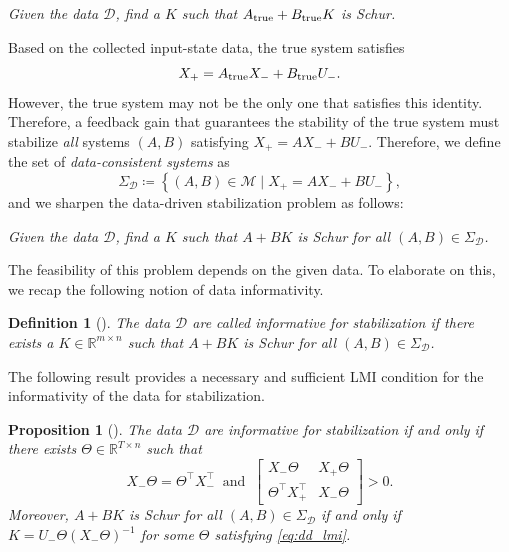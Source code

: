 \documentclass[9pt,shortpaper,twoside,web]{ieeecolor}
\newcommand{\set}[2]{\left\{#1 \mid #2\right\}}
\newtheorem{proposition}[theorem]{Proposition}
\newtheorem{definition}[theorem]{Definition}
\begin{document}
\begin{center}
\textit{Given the data $\mathcal{D}$, find a $K$ such that $A_\textup{true}+B_\textup{true}K$ is Schur.}
\end{center}
Based on the collected input-state data, the true system satisfies 
\begin{equation}
\label{eq:lineqtrue}
X_+=A_\textup{true}X_-+B_\textup{true}U_-.
\end{equation}
However, the true system may not be the only one that satisfies this identity. Therefore, a feedback gain that guarantees the stability of the true system must stabilize \emph{all} systems $(A,B)$ satisfying \mbox{$X_+=AX_-+BU_-$}. Therefore, we define the set of \emph{data-consistent systems} as
\begin{equation}
\label{eq:exp}
\Sigma_\mathcal{D}\coloneqq \set{(A,B)\in\mathcal{M}}{X_+=AX_-+BU_-},
\end{equation}
and we sharpen the data-driven stabilization problem as follows:
\begin{center}
\textit{Given the data $\mathcal{D}$, find a $K$ such that $A+BK$ is Schur for all $(A,B)\in\Sigma_\mathcal{D}$.}
\end{center}
The feasibility of this problem depends on the given data. To elaborate on this, we recap the following notion of data informativity. 

\begin{definition}[{\cite[Def. 12]{van2020data}}]
\label{def:1}
The data $\mathcal{D}$ are called \emph{informative for stabilization} if there exists a $K\in\mathbb{R}^{m\times n}$ such that $A+BK$ is Schur for all $(A,B)\in\Sigma_\mathcal{D}$. 
\end{definition}

The following result provides a necessary and sufficient LMI condition for the informativity of the data for stabilization.

\begin{proposition}[{\cite[Thm. 17]{van2020data}}]
\label{prop:1}
The data $\mathcal{D}$ are informative for stabilization \emph{if and only if} there exists $\Theta\in\mathbb{R}^{T\times n}$ such that
\begin{equation}
\label{eq:dd_lmi}
X_-\Theta=\Theta^\top X_-^\top\ \text{ and }\ \begin{bmatrix}
X_-\Theta & X_+\Theta \\
\Theta^\top X_+^\top & X_-\Theta
\end{bmatrix}>0.
\end{equation}
Moreover, $A+BK$ is Schur for all $(A,B)\in\Sigma_\mathcal{D}$ \emph{if and only if} $K=U_-\Theta(X_-\Theta)^{-1}$ for some $\Theta$ satisfying \eqref{eq:dd_lmi}. 
\end{proposition}
\end{document}
